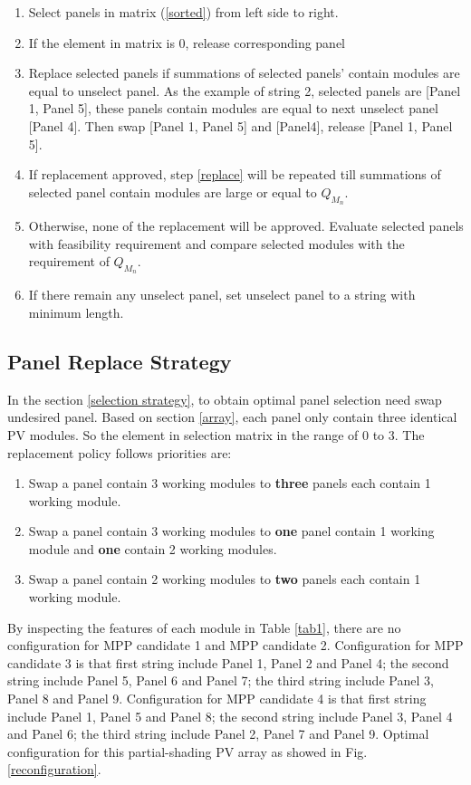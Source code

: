 \documentclass[conference]{IEEEtran}
\begin{document}
\begin{enumerate} [1-]
\item Select panels in matrix (\ref{sorted}) from left side to right.
\item If the element in matrix is 0, release corresponding panel
\item Replace selected panels if summations of selected panels' contain modules are equal to unselect panel. As the example of string 2, selected panels are [Panel 1, Panel 5], these panels contain modules are equal to next unselect panel [Panel 4]. Then swap [Panel 1, Panel 5] and [Panel4], release [Panel 1, Panel 5]. \label{replace}
\item If replacement approved, step \ref{replace} will be repeated till summations of selected panel contain modules are large or equal to \textit{$Q_{M_n}$}.
\item Otherwise, none of the replacement will be approved. Evaluate selected panels with feasibility requirement and compare selected modules with the requirement of \textit{$Q_{M_n}$}.
\item If there remain any unselect panel, set unselect panel to a string with minimum length. 
\end{enumerate}
\subsection{Panel Replace Strategy}
In the section \ref{selection strategy}, to obtain optimal panel selection need swap undesired panel. Based on section \ref{array}, each panel only contain three identical PV modules. So the element in selection matrix in the range of 0 to 3. The replacement policy follows priorities are:
\begin{enumerate} [ (1) ]
\item Swap a panel contain 3 working modules to \textbf{three} panels each contain 1 working module.
\item Swap a panel contain 3 working modules to \textbf{one} panel contain 1 working module and \textbf{one} contain 2 working modules.
\item Swap a panel contain 2 working modules to \textbf{two} panels each contain 1 working module.
\end{enumerate}

By inspecting the features of each module in Table \ref{tab1}, there are no configuration for MPP candidate 1 and MPP candidate 2. Configuration for MPP candidate 3 is that first string include Panel 1, Panel 2 and Panel 4; the second string include Panel 5, Panel 6 and Panel 7; the third string include Panel 3, Panel 8 and Panel 9. Configuration for MPP candidate 4 is that first string include Panel 1, Panel 5 and Panel 8; the second string include Panel 3, Panel 4 and Panel 6; the third string include Panel 2, Panel 7 and Panel 9. Optimal configuration for this partial-shading PV array as showed in Fig. \ref{reconfiguration}. 
\end{document}
